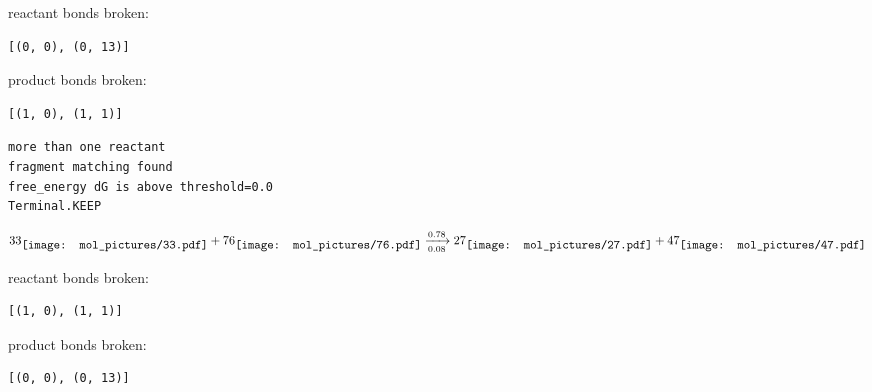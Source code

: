 \documentclass{article}
\begin{document}
reactant bonds broken:\begin{verbatim}
[(0, 0), (0, 13)]
\end{verbatim}
product bonds broken:\begin{verbatim}
[(1, 0), (1, 1)]
\end{verbatim}




\vspace{1cm}
\begin{verbatim}
more than one reactant
fragment matching found
free_energy dG is above threshold=0.0
Terminal.KEEP
\end{verbatim}
$$
33
\raisebox{-.5\height}{\texttt{[image: mol\_pictures/33.pdf]}}
+
76
\raisebox{-.5\height}{\texttt{[image: mol\_pictures/76.pdf]}}
\xrightarrow[0.08]{0.78}
27
\raisebox{-.5\height}{\texttt{[image: mol\_pictures/27.pdf]}}
+
47
\raisebox{-.5\height}{\texttt{[image: mol\_pictures/47.pdf]}}
$$


reactant bonds broken:\begin{verbatim}
[(1, 0), (1, 1)]
\end{verbatim}
product bonds broken:\begin{verbatim}
[(0, 0), (0, 13)]
\end{verbatim}




\vspace{1cm}
\end{document}

